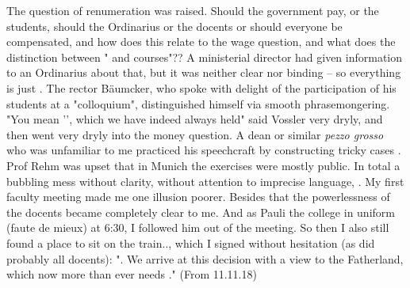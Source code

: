 
The question of renumeration was raised. Should the government pay, or the students, should the Ordinarius or the docents or should everyone be compensated, and how does this relate to the wage question, and what does the distinction between " and  courses"?? A ministerial director had given information to an Ordinarius about that, but it was neither clear nor binding -- so everything is just . The rector Bäumcker, who spoke with delight of the participation of his students at a "colloquium", distinguished himself via smooth phrasemongering. "You mean '', which we have indeed always held" said Vossler very dryly, and then went very dryly into the money question. A dean or similar \textit{pezzo grosso} who was unfamiliar to me practiced his speechcraft by constructing tricky cases . Prof Rehm was upset that in Munich the exercises were mostly public. In total a bubbling mess without clarity, without attention to imprecise language, . My first faculty meeting made me one illusion poorer. Besides that the powerlessness of the docents became completely clear to me. And as Pauli  the college in uniform (faute de mieux) at 6:30, I followed him out of the meeting. So then I also still found a place to sit on the train.., which I signed without hesitation (as did probably all docents): ". We arrive at this decision with a view to the Fatherland, which now more than ever needs ." (From 11.11.18)

